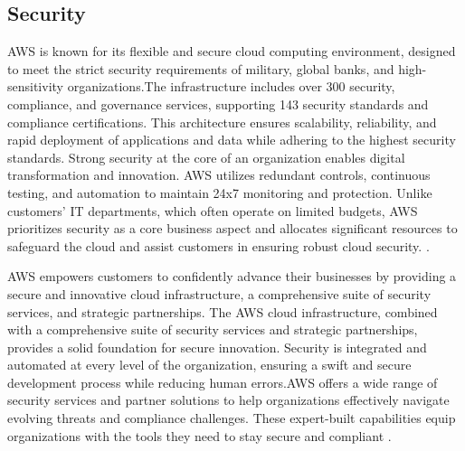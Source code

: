 \subsection{Security}
AWS is known for its flexible and secure cloud computing environment, designed to meet the strict security requirements of military, global banks, and high-sensitivity organizations.The infrastructure includes over 300 security, compliance, and governance services, supporting 143 security standards and compliance certifications. This architecture ensures scalability, reliability, and rapid deployment of applications and data while adhering to the highest security standards. Strong security at the core of an organization enables digital transformation and innovation. AWS utilizes redundant controls, continuous testing, and automation to maintain 24x7 monitoring and protection. Unlike customers' IT departments, which often operate on limited budgets, AWS prioritizes security as a core business aspect and allocates significant resources to safeguard the cloud and assist customers in ensuring robust cloud security. \cite{AWSCloudComputing}. 

AWS empowers customers to confidently advance their businesses by providing a secure and innovative cloud infrastructure, a comprehensive suite of security services, and strategic partnerships. The AWS cloud infrastructure, combined with a comprehensive suite of security services and strategic partnerships, provides a solid foundation for secure innovation. Security is integrated and automated at every level of the organization, ensuring a swift and secure development process while reducing human errors.AWS offers a wide range of security services and partner solutions to help organizations effectively navigate evolving threats and compliance challenges. These expert-built capabilities equip organizations with the tools they need to stay secure and compliant \cite{AWSSecurity}.

